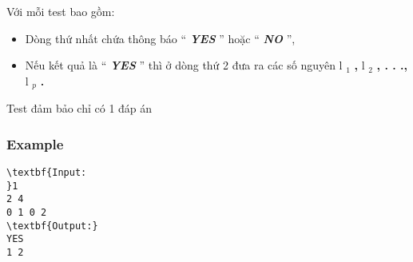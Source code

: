 Với mỗi test bao gồm:
\begin{itemize}
	\item Dòng thứ nhất chứa thông báo “ \textbf{\emph{ YES }} ” hoặc “ \textbf{\emph{ NO }} ”,
	\item Nếu kết quả là “ \textbf{\emph{ YES }} ” thì ở dòng thứ 2 đưa ra các số nguyên l \textbf{$_ 1 $}\textbf{ , } l \textbf{$_ 2 $}\textbf{ , . . ., } l \emph{$_ p $}\textbf{ . }
\end{itemize}

Test đảm bảo chỉ có 1 đáp án

\subsubsection{Example}
\begin{verbatim}
\textbf{Input:
}1
2 4
0 1 0 2
\textbf{Output:}
YES
1 2


\end{verbatim}
